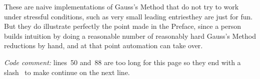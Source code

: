 These are naive implementations of Gauss's Method that do not try to 
work under stressful conditions, such as
very small leading entries\Dash they are just for fun.
But they do illustrate perfectly the point made in the Preface, 
since a person
builds intuition by doing a reasonable number of reasonably hard Gauss's Method
reductions by hand, and at that point automation can take over.

\textit{Code comment:} lines~50 and~88 are too long
for this page so they end with a 
slash~\inlinecode{\\} to make \python{} continue on the
next line. 


\endinput


TODO:
